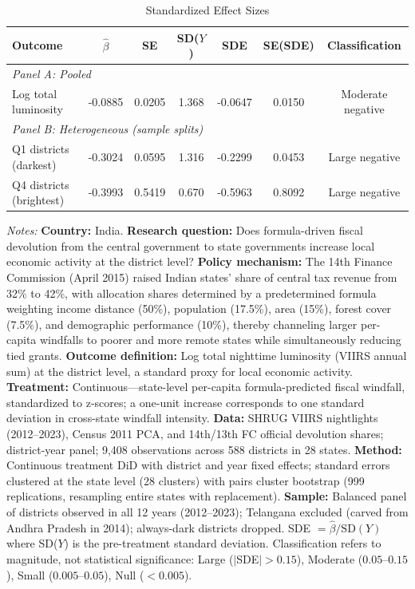 \begin{table}[htbp]
\centering
\begin{threeparttable}
\caption{Standardized Effect Sizes}
\label{tab:sde}
\small
\begin{tabular}{lcccccc}
\toprule
Outcome & $\hat{\beta}$ & SE & SD($Y$) & SDE & SE(SDE) & Classification \\
\midrule
\multicolumn{7}{l}{\textit{Panel A: Pooled}} \\[3pt]
Log total luminosity & -0.0885 & 0.0205 & 1.368 & -0.0647 & 0.0150 & Moderate negative \\
\midrule
\multicolumn{7}{l}{\textit{Panel B: Heterogeneous (sample splits)}} \\[3pt]
Q1 districts (darkest) & -0.3024 & 0.0595 & 1.316 & -0.2299 & 0.0453 & Large negative \\
Q4 districts (brightest) & -0.3993 & 0.5419 & 0.670 & -0.5963 & 0.8092 & Large negative \\
\bottomrule
\end{tabular}
\begin{tablenotes}[flushleft]\footnotesize
\item \textit{Notes:} \textbf{Country:} India. \textbf{Research question:} Does formula-driven fiscal devolution from the central government to state governments increase local economic activity at the district level? \textbf{Policy mechanism:} The 14th Finance Commission (April 2015) raised Indian states' share of central tax revenue from 32\% to 42\%, with allocation shares determined by a predetermined formula weighting income distance (50\%), population (17.5\%), area (15\%), forest cover (7.5\%), and demographic performance (10\%), thereby channeling larger per-capita windfalls to poorer and more remote states while simultaneously reducing tied grants. \textbf{Outcome definition:} Log total nighttime luminosity (VIIRS annual sum) at the district level, a standard proxy for local economic activity. \textbf{Treatment:} Continuous---state-level per-capita formula-predicted fiscal windfall, standardized to z-scores; a one-unit increase corresponds to one standard deviation in cross-state windfall intensity. \textbf{Data:} SHRUG VIIRS nightlights (2012--2023), Census 2011 PCA, and 14th/13th FC official devolution shares; district-year panel; 9,408 observations across 588 districts in 28 states. \textbf{Method:} Continuous treatment DiD with district and year fixed effects; standard errors clustered at the state level (28 clusters) with pairs cluster bootstrap (999 replications, resampling entire states with replacement). \textbf{Sample:} Balanced panel of districts observed in all 12 years (2012--2023); Telangana excluded (carved from Andhra Pradesh in 2014); always-dark districts dropped. SDE $= \hat{\beta} / \text{SD}(Y)$ where SD($Y$) is the pre-treatment standard deviation. Classification refers to magnitude, not statistical significance: Large ($|$SDE$| > 0.15$), Moderate ($0.05$--$0.15$), Small ($0.005$--$0.05$), Null ($< 0.005$).
\end{tablenotes}
\end{threeparttable}
\end{table}
